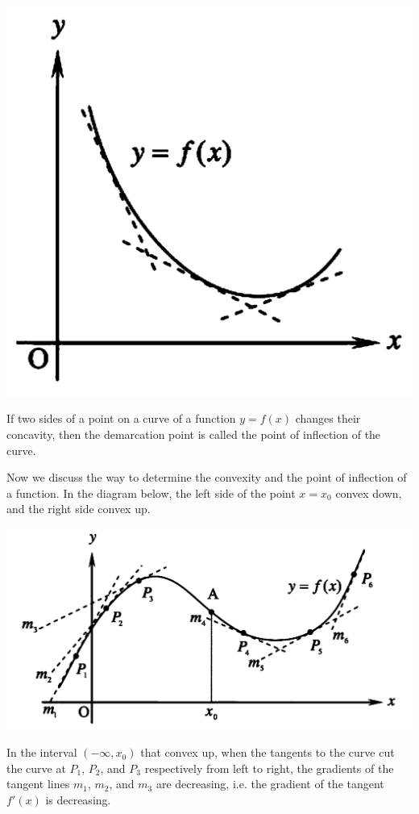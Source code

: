 \begin{enumerate}
\begin{center}
              \includegraphics[scale=0.25]{assets/26-13.png}
          \end{center}
\end{enumerate}

If two sides of a point on a curve of a function $y = f(x)$ changes their
concavity, then the demarcation point is called the point of inflection of the
curve.

Now we discuss the way to determine the convexity and the point of inflection
of a function. In the diagram below, the left side of the point $x = x_0$
convex down, and the right side convex up.
\begin{center}
    \includegraphics[scale=0.25]{assets/26-14.png}
\end{center}
In the interval $(-\infty, x_0)$ that convex up, when the tangents to the curve cut the curve at $P_1$, $P_2$, and $P_3$ respectively from left to right, the gradients of the tangent lines $m_1$, $m_2$, and $m_3$ are decreasing, i.e. the gradient of the tangent $f'(x)$ is decreasing.

